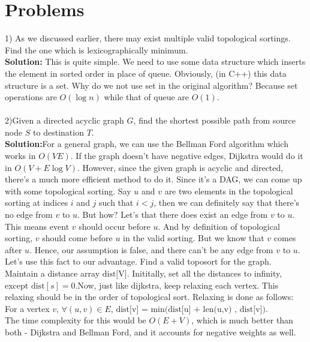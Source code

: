 \section{Problems}
1) As we discussed earlier, there may exist multiple valid topological sortings. Find  the one which is lexicographically minimum.\\
\textbf{Solution:} This is quite simple. We need to use some data structure which inserts the element in sorted order in place of queue. Obviously, (in C++) this data structure is a set. Why do we not use set in the original algorithm? Because set operations are $O(\log n)$ while that of queue are $O(1)$.\\\\
2)Given a directed acyclic graph $G$, find the shortest possible path from source node $S$ to destination $T$.\\
\textbf{Solution:}For a general graph, we can use the Bellman Ford algorithm which works in $O(VE)$. If the graph doesn't have negative edges, Dijkstra would do it in $O(V + E \log V)$. However, since the given graph is acyclic and directed, there's a much more efficient method to do it. Since it's a DAG, we can come up with some topological sorting. Say $u$ and $v$ are two elements in the topological sorting at indices $i$ and $j$ such that $i < j$, then we can definitely say that there's no edge from $v$ to $u$. But how? Let's that there does exist an edge from $v$ to $u$. This means event $v$ should occur before $u$. And by definition of topological sorting, $v$ should come before $u$ in the valid sorting. But we know that $v$ comes after $u$. Hence, our assumption is false, and there can't be any edge from $v$ to $u$. \\
Let's use this fact to our advantage. Find a valid toposort for the graph. Maintain a distance array $\text{dist[V]}$. Inititally, set all the distances to infinity, except $\text{dist}[s] = 0$.Now, just like dijkstra, keep relaxing each vertex. This relaxing should be in the order of topological sort. Relaxing is done as follows: For a vertex $v$, $\forall(u,v) \in E$, $\text{dist[v] = min(dist[u] + len(u,v) , dist[v]})$.\\
The time complexity  for this would be $O(E+V)$, which is much better than both - Dijkstra and Bellman Ford, and it accounts for negative weights as well.

